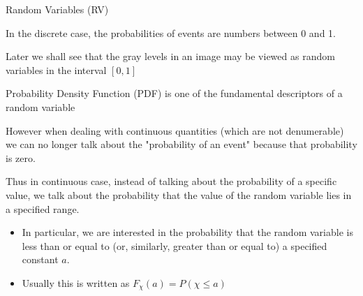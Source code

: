 %
%
\begin{slide}{Random Variables (RV)}
\begin{titlelist}{}{}
\small
\item<2-> In the discrete case, the probabilities of events are numbers between 0 and 1.  

\item<3-> Later we shall see that the gray levels in an image may be viewed as random variables in the interval $[0,1]$

\item<4-> Probability Density Function (PDF) is one of the fundamental descriptors of a random variable


\item<5-> 
However when dealing with continuous quantities (which are not denumerable) we can no longer talk about the "probability of an event" because that probability is zero. 

\item<6-> 
Thus in continuous case, instead of talking about the probability of a specific value, we talk about the probability that the value of the random variable lies in a specified range.  
\begin{itemize}
\scriptsize
\item<7-> 
In particular, we are interested in the probability that the random variable is less than or equal to (or, similarly, greater than or equal to) a specified constant $a$.  

\item<8-> 
Usually this is written as $ F_{\chi}(a) = P \left( \chi \leq a\right) $
\end{itemize}


\end{titlelist}

\end{slide}



